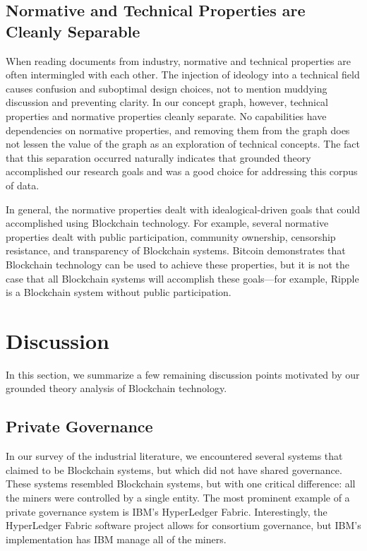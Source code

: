 \subsection{Normative and Technical Properties are Cleanly Separable}
\label{sec:normative}


When reading documents from industry, normative and technical properties are often intermingled with each other.
The injection of ideology into a technical field causes confusion and suboptimal design choices, not to mention muddying discussion and preventing clarity.
In our concept graph, however, technical properties and normative properties cleanly separate.
No capabilities have dependencies on normative properties, and removing them from the graph does not lessen the value of the graph as an exploration of technical concepts.
The fact that this separation occurred naturally indicates that grounded theory accomplished our research goals and was a good choice for addressing this corpus of data.

In general, the normative properties dealt with idealogical-driven goals that could accomplished using Blockchain technology.
For example, several normative properties dealt with public participation, community ownership, censorship resistance, and transparency of Blockchain systems.
Bitcoin demonstrates that Blockchain technology can be used to achieve these properties, but it is not the case that all Blockchain systems will accomplish these goals---for example, Ripple is a Blockchain system without public participation.

\section{Discussion}
In this section, we summarize a few remaining discussion points motivated by our grounded theory analysis of Blockchain technology.

\subsection{Private Governance}

In our survey of the industrial literature, we encountered several systems that claimed to be Blockchain systems, but which did not have shared governance.
These systems resembled Blockchain systems, but with one critical difference: all the miners were controlled by a single entity.
The most prominent example of a private governance system is IBM's HyperLedger Fabric.
Interestingly, the HyperLedger Fabric software project allows for consortium governance, but IBM's implementation has IBM manage all of the miners.

